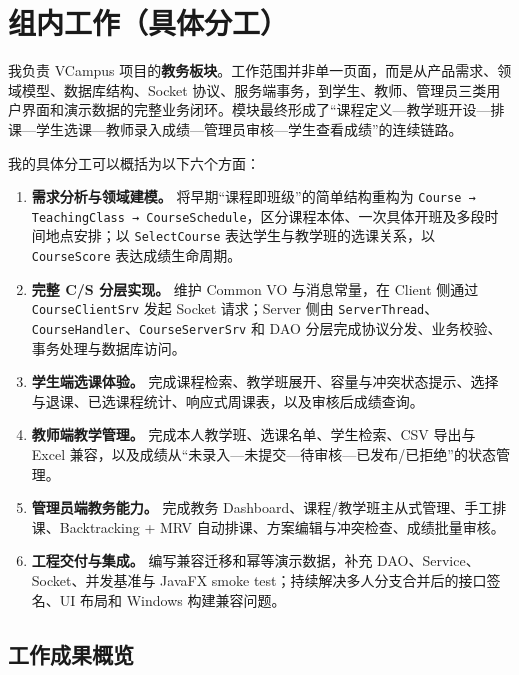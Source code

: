 \documentclass[UTF8,11pt,a4paper]{ctexart}
\newcommand{\codeword}[1]{\texttt{\color{VCGreen}#1}}
\begin{document}
\tableofcontents
\clearpage

\section{组内工作（具体分工）}

\begin{keybox}[title={\bfseries 我的模块定位}]
我负责 VCampus 项目的\textbf{教务板块}。工作范围并非单一页面，而是从产品需求、领域模型、数据库结构、Socket 协议、服务端事务，到学生、教师、管理员三类用户界面和演示数据的完整业务闭环。模块最终形成了“课程定义—教学班开设—排课—学生选课—教师录入成绩—管理员审核—学生查看成绩”的连续链路。
\end{keybox}

我的具体分工可以概括为以下六个方面：

\begin{enumerate}
  \item \textbf{需求分析与领域建模。} 将早期“课程即班级”的简单结构重构为 \codeword{Course → TeachingClass → CourseSchedule}，区分课程本体、一次具体开班及多段时间地点安排；以 \codeword{SelectCourse} 表达学生与教学班的选课关系，以 \codeword{CourseScore} 表达成绩生命周期。
  \item \textbf{完整 C/S 分层实现。} 维护 Common VO 与消息常量，在 Client 侧通过 \codeword{CourseClientSrv} 发起 Socket 请求；Server 侧由 \codeword{ServerThread}、\codeword{CourseHandler}、\codeword{CourseServerSrv} 和 DAO 分层完成协议分发、业务校验、事务处理与数据库访问。
  \item \textbf{学生端选课体验。} 完成课程检索、教学班展开、容量与冲突状态提示、选择与退课、已选课程统计、响应式周课表，以及审核后成绩查询。
  \item \textbf{教师端教学管理。} 完成本人教学班、选课名单、学生检索、CSV 导出与 Excel 兼容，以及成绩从“未录入—未提交—待审核—已发布/已拒绝”的状态管理。
  \item \textbf{管理员端教务能力。} 完成教务 Dashboard、课程/教学班主从式管理、手工排课、Backtracking + MRV 自动排课、方案编辑与冲突检查、成绩批量审核。
  \item \textbf{工程交付与集成。} 编写兼容迁移和幂等演示数据，补充 DAO、Service、Socket、并发基准与 JavaFX smoke test；持续解决多人分支合并后的接口签名、UI 布局和 Windows 构建兼容问题。
\end{enumerate}

\subsection{工作成果概览}
\end{document}
